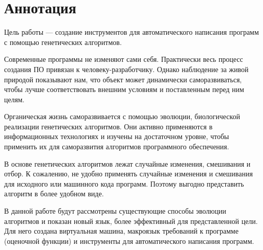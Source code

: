 \documentclass[utf8]{eskdtext}
\begin{document}
\section*{Аннотация}

Цель работы — создание инструментов для автоматического написания программ с
помощью генетических алгоритмов.

Современные программы не изменяют сами себя. Практически весь процесс создания
ПО привязан к человеку-разработчику. Однако наблюдение за живой природой
показывают нам, что объект может динамически саморазвиваться, чтобы лучше
соответствовать внешним условиям и поставленным перед ним целям.

Органическая жизнь саморазвивается с помощью эволюции, биологической реализации
генетических алгоритмов. Они активно применяются в информационных технологиях и
изучены на достаточном уровне, чтобы применить их для саморазвития алгоритмов
программного обеспечения.

В основе генетических алгоритмов лежат случайные изменения, смешивания и отбор.
К сожалению, не удобно применять случайные изменения и смешивания для исходного
или машинного кода программ. Поэтому выгодно представить алгоритм в более
удобном виде.

В данной работе будут рассмотрены существующие способы эволюции алгоритмов и
показан новый язык, более эффективный для представленной цели. Для него создана
виртуальная машина, макроязык требований к программе (оценочной функции) и
инструменты для автоматического написания программ.
\end{document}
